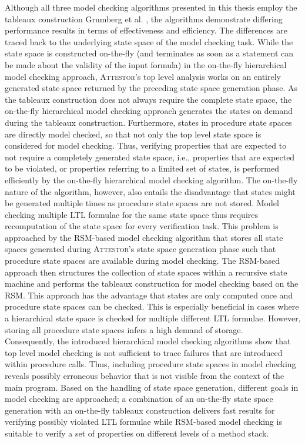 \documentclass[a4paper, 12pt, twoside]{report}
\begin{document}
	Although all three model checking algorithms presented in this thesis employ the tableaux construction Grumberg et al. \cite{bhat1995efficient}, the algorithms demonstrate differing performance results in terms of effectiveness and efficiency. The differences are traced back to the underlying state space of the model checking task. While the state space is constructed on-the-fly (and terminates as soon as a statement can be made about the validity of the input formula) in the on-the-fly hierarchical model checking approach, \textsc{Attestor}'s top level analysis works on an entirely generated state space returned by the preceding state space generation phase. As the tableaux construction does not always require the complete state space, the on-the-fly hierarchical model checking approach generates the states on demand during the tableaux construction. Furthermore, states in procedure state spaces are directly model checked, so that not only the top level state space is considered for model checking. Thus, verifying properties that are expected to not require a completely generated state space, i.e., properties that are expected to be violated, or properties referring to a limited set of states, is performed efficiently by the on-the-fly hierarchical model checking algorithm. The on-the-fly nature of the algorithm, however, also entails the disadvantage that states might be generated multiple times as procedure state spaces are not stored. Model checking multiple LTL formulae for the same state space thus requires recomputation of the state space for every verification task. This problem is approached by the RSM-based model checking algorithm that stores all state spaces generated during \textsc{Attestor}'s state space generation phase such that procedure state spaces are available during model checking. The RSM-based approach then structures the collection of state spaces within a recursive state machine and performs the tableaux construction for model checking based on the RSM. This approach has the advantage that states are only computed once and procedure state spaces can be checked. This is especially beneficial in cases where a hierarchical state space is checked for multiple different LTL formulae. However, storing all procedure state spaces infers a high demand of storage.\\
	
	Consequently, the introduced hierarchical model checking algorithms show that top level model checking is not sufficient to trace failures that are introduced within procedure calls. Thus, including procedure state spaces in model checking reveals possibly erroneous behavior that is not visible from the context of the main program. Based on the handling of state space generation, different goals in model checking are approached; a combination of an on-the-fly state space generation with an on-the-fly tableaux construction delivers fast results for verifying possibly violated LTL formulae while RSM-based model checking is suitable to verify a set of properties on different levels of a method stack.\\
		
\end{document}
